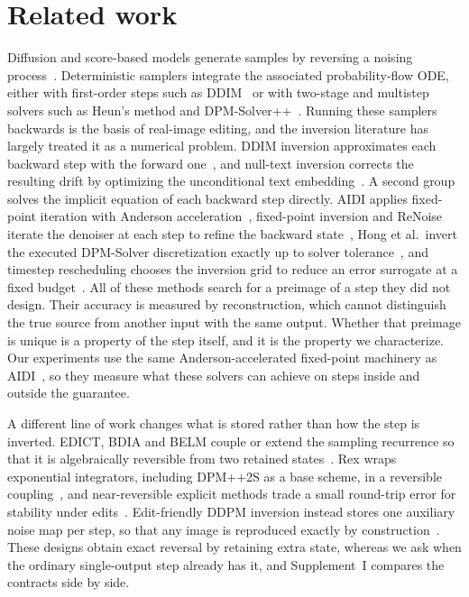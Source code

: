 \section{Related work}
\label{sec:related}
Diffusion and score-based models generate samples by reversing a noising process~\cite{ho2020,songsde2021}. Deterministic samplers integrate the associated probability-flow ODE, either with first-order steps such as DDIM~\cite{songddim2021} or with two-stage and multistep solvers such as Heun's method and DPM-Solver++~\cite{karras2022,lu2022}. Running these samplers backwards is the basis of real-image editing, and the inversion literature has largely treated it as a numerical problem. DDIM inversion approximates each backward step with the forward one~\cite{songddim2021}, and null-text inversion corrects the resulting drift by optimizing the unconditional text embedding~\cite{mokady2023}. A second group solves the implicit equation of each backward step directly. AIDI applies fixed-point iteration with Anderson acceleration~\cite{pan2023aidi}, fixed-point inversion and ReNoise iterate the denoiser at each step to refine the backward state~\cite{meiri2023fpi,garibi2024renoise}, Hong et al.\ invert the executed DPM-Solver discretization exactly up to solver tolerance~\cite{hong2024}, and timestep rescheduling chooses the inversion grid to reduce an error surrogate at a fixed budget~\cite{sun2026}. All of these methods search for a preimage of a step they did not design. Their accuracy is measured by reconstruction, which cannot distinguish the true source from another input with the same output. Whether that preimage is unique is a property of the step itself, and it is the property we characterize. Our experiments use the same Anderson-accelerated fixed-point machinery as AIDI~\cite{walker2011}, so they measure what these solvers can achieve on steps inside and outside the guarantee.

A different line of work changes what is stored rather than how the step is inverted. EDICT, BDIA and BELM couple or extend the sampling recurrence so that it is algebraically reversible from two retained states~\cite{wallace2023,zhang2024,wang2024}. Rex wraps exponential integrators, including DPM++2S as a base scheme, in a reversible coupling~\cite{rex2026}, and near-reversible explicit methods trade a small round-trip error for stability under edits~\cite{barancikova2026}. Edit-friendly DDPM inversion instead stores one auxiliary noise map per step, so that any image is reproduced exactly by construction~\cite{huberman2024ddpm}. These designs obtain exact reversal by retaining extra state, whereas we ask when the ordinary single-output step already has it, and Supplement~I compares the contracts side by side.

